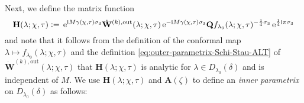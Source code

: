 Next, we define the matrix function
\begin{equation}
\mathbf{H}(\lambda;\chi,\tau)\vcentcolon=\,\mathrm{e}^{\mathrm{i} M\gamma(\chi,\tau)\sigma_3}\dot{\mathbf{W}}^{(k),\mathrm{out}}(\lambda;\chi,\tau)\,\mathrm{e}^{-\mathrm{i} M\gamma(\chi,\tau)\sigma_3}\mathbf{Q}f_{\lambda_0}(\lambda;\chi,\tau)^{-\frac{1}{4}\sigma_3}\,\mathrm{e}^{\frac{1}{4}\mathrm{i}\pi\sigma_3}
\end{equation}
and note that it follows from the definition of the conformal map $\lambda\mapsto f_{\lambda_0}(\lambda;\chi,\tau)$ and the definition \eqref{eq:outer-parametrix-Schi-Stau-ALT} of $\dot{\mathbf{W}}^{(k),\mathrm{out}}(\lambda;\chi,\tau)$ that $\mathbf{H}(\lambda;\chi,\tau)$ is analytic for $\lambda\in D_{\lambda_0}(\delta)$ and is independent of $M$.
We use $\mathbf{H}(\lambda;\chi,\tau)$ and $\mathbf{A}(\zeta)$ to define an \emph{inner parametrix} on $D_{\lambda_0}(\delta)$ as follows:
